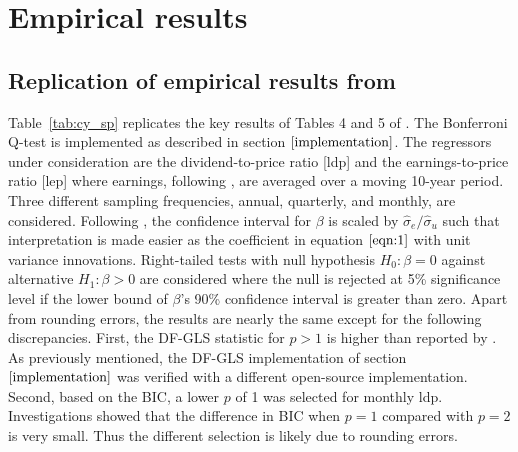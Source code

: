 \documentclass{article}
\begin{document}
\section{Empirical results}
\label{Empirical Results}
\subsection{Replication of empirical results from \citet{campbell2006efficient}}
Table~\vref{tab:cy_sp} replicates the key results of Tables 4 and 5 of \citet{campbell2006efficient}. The Bonferroni Q-test is implemented as described in section $\ref{implementation}$. The regressors under consideration are the dividend-to-price ratio [ldp] and the earnings-to-price ratio [lep] where earnings, following \citet{shiller2000irrational}, are averaged over a moving 10-year period. Three different sampling frequencies, annual, quarterly, and monthly, are considered. Following \citet{campbell2006efficient}, the confidence interval for $\beta$ is scaled by $\widehat{\sigma}_{e} / \widehat{\sigma}_{u}$ such that interpretation is made easier as the coefficient in equation $\ref{eqn:1}$ with unit variance innovations. Right-tailed tests with null hypothesis $H_0: \beta=0$ against alternative $H_1: \beta>0$ are considered where the null is rejected at 5\% significance level if the lower bound of $\beta$'s 90\% confidence interval is greater than zero. Apart from rounding errors, the results are nearly the same except for the following discrepancies. First, the DF-GLS statistic for $p>1$ is higher than reported by \citet{campbell2006efficient}.  As previously mentioned, the DF-GLS implementation of section $\ref{implementation}$ was verified with a different open-source implementation. Second, based on the BIC, a lower $p$ of 1 was selected for monthly ldp. Investigations showed that the difference in BIC when $p=1$ compared with $p=2$ is very small. Thus the different selection is likely due to rounding errors. 
\end{document}

